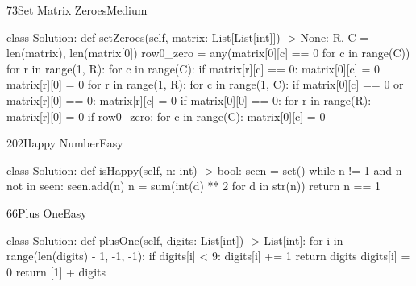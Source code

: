 \begin{problem}{73}{Set Matrix Zeroes}{Medium}
\begin{code}
class Solution:
    def setZeroes(self, matrix: List[List[int]]) -> None:
        R, C = len(matrix), len(matrix[0])
        row0_zero = any(matrix[0][c] == 0 for c in range(C))
        for r in range(1, R):
            for c in range(C):
                if matrix[r][c] == 0:
                    matrix[0][c] = 0
                    matrix[r][0] = 0
        for r in range(1, R):
            for c in range(1, C):
                if matrix[0][c] == 0 or matrix[r][0] == 0:
                    matrix[r][c] = 0
        if matrix[0][0] == 0:
            for r in range(R):
                matrix[r][0] = 0
        if row0_zero:
            for c in range(C):
                matrix[0][c] = 0
\end{code}
\end{problem}

\begin{problem}{202}{Happy Number}{Easy}
\begin{code}
class Solution:
    def isHappy(self, n: int) -> bool:
        seen = set()
        while n != 1 and n not in seen:
            seen.add(n)
            n = sum(int(d) ** 2 for d in str(n))
        return n == 1
\end{code}
\end{problem}

\begin{problem}{66}{Plus One}{Easy}
\begin{code}
class Solution:
    def plusOne(self, digits: List[int]) -> List[int]:
        for i in range(len(digits) - 1, -1, -1):
            if digits[i] < 9:
                digits[i] += 1
                return digits
            digits[i] = 0
        return [1] + digits
\end{code}
\end{problem}

